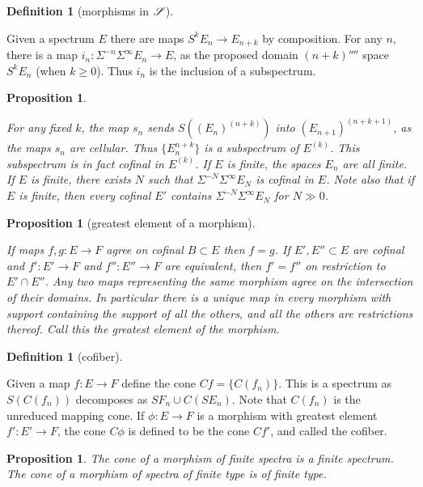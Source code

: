 \documentclass[11pt]{article}
\theoremstyle{plain}
\newtheorem{prop}[thm]{Proposition}
\theoremstyle{definition}
\newtheorem{defn}[thm]{Definition}
\begin{document}
{\begin{defn}[morphisms in $\mathscr{S}$]
\end{defn}
Given a spectrum $E$ there are maps $S^kE_n\to E_{n+k}$ by composition. For any
$n$, there is a map $i_n:\Sigma^{-n}\Sigma^\infty E_n\to E$, as the proposed
domain $(n+k)\fourth$ space $S^kE_n$ (when $k\geq0$). Thus $i_n$ is the
inclusion of a subspectrum.
\setcounter{thm}{4}
\begin{prop}\hfil
\begin{itemise}
\itm[(i)] For any fixed $k$, the map $s_n$ sends $S((E_n)^{(n+k)})$ into
$(E_{n+1})^{(n+k+1)}$, as the maps $s_n$ are cellular. Thus $\{E_n^{n+k}\}$ is a
subspectrum of $E^{(k)}$. This subspectrum is in fact cofinal in $E^{(k)}$.
\itm[(ii)]If $E$ is finite, the spaces $E_n$ are all finite.
\itm[(iii)]If $E$ is finite, there exists $N$ such that 
$\Sigma^{-N}\Sigma^\infty E_N$ is cofinal in $E$.
\itm[NB:]Note also that if $E$ is finite, then every cofinal $E'$ contains
$\Sigma^{-N}\Sigma^\infty E_N$ for $N\gg0$.
\end{itemise}
\end{prop}
\begin{prop}[greatest element of a morphism]\hfil
\begin{itemise}
\itm[(i)] If maps $f,g:E\to F$ agree on cofinal $B\subset E$ then $f=g$.
\itm[(ii)] If $E',E''\subset E$ are cofinal and $f':E'\to F$ and $f'':E''\to F$
are equivalent, then $f'=f''$ on restriction to $E'\cap E''$.
\itm[(iii)] Any two maps representing the same morphism agree on the
intersection of their domains. In particular there is a unique map in every
morphism with support containing the support of all the others, and all the
others are restrictions thereof. Call this the greatest element of the morphism.
\end{itemise}
\end{prop}
\begin{defn}[cofiber]\hfil
\begin{itemise}
\itm[(a)] Given a map $f:E\to F$ define the cone $Cf=\{C(f_n)\}$. This is a
spectrum as $S(C(f_n))$ decomposes as $SF_n\cup C(SE_n)$. Note that $C(f_n)$ is
the unreduced mapping cone.
\itm[(b)] If $\phi:E\to F$ is a morphism with greatest element $f':E'\to F$,
the cone $C\phi$ is defined to be the cone $Cf'$, and called the cofiber.
\end{itemise}
\end{defn}
\begin{prop}
The cone of a morphism of finite spectra is a finite spectrum. The cone of a
morphism of spectra of finite type is of finite type.
\end{prop}
}
\end{document}
